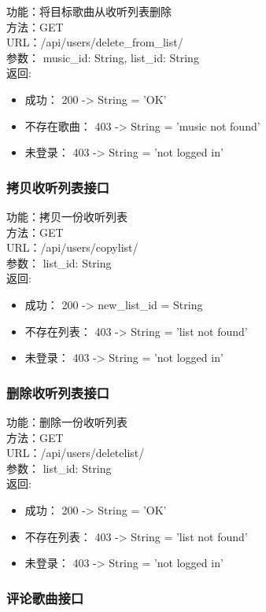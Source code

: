 \noindent
功能：将目标歌曲从收听列表删除\\
方法：GET\\
URL：/api/users/delete\_from\_list/\\
参数： music\_id: String, list\_id: String\\
返回:
\begin{itemize}
	\item 成功： 200 -> String = 'OK'
	\item 不存在歌曲： 403 -> String = 'music not found'
	\item 未登录： 403 -> String = 'not logged in'
\end{itemize}

\subsubsection{拷贝收听列表接口}

\noindent
功能：拷贝一份收听列表\\
方法：GET\\
URL：/api/users/copylist/\\
参数： list\_id: String\\
返回:
\begin{itemize}
	\item 成功： 200 -> new\_list\_id = String
	\item 不存在列表： 403 -> String = 'list not found'
	\item 未登录： 403 -> String = 'not logged in'
\end{itemize}

\subsubsection{删除收听列表接口}

\noindent
功能：删除一份收听列表\\
方法：GET\\
URL：/api/users/deletelist/\\
参数： list\_id: String\\
返回:
\begin{itemize}
	\item 成功： 200 -> String = 'OK'
	\item 不存在列表： 403 -> String = 'list not found'
	\item 未登录： 403 -> String = 'not logged in'
\end{itemize}

\subsubsection{评论歌曲接口}

